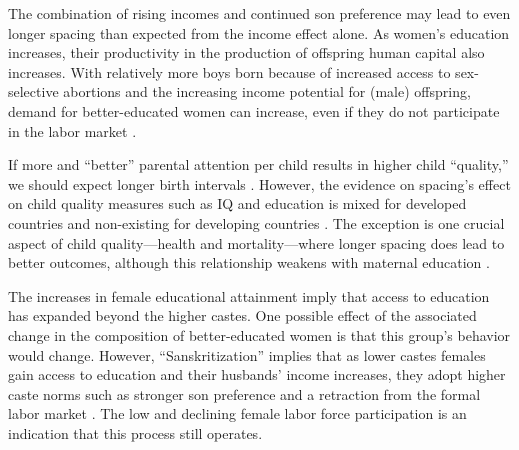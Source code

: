 \documentclass[12pt,letterpaper]{article}
\begin{document}
The combination of rising incomes and continued son preference may lead to even longer 
spacing than expected from the income effect alone.
As women's education increases, their productivity in the production of offspring human 
capital also increases.
With relatively more boys born because of increased access to sex-selective 
abortions and the increasing income potential for (male) offspring, demand for 
better-educated women can increase, even if they do not participate in the labor market 
\citep{Behrman1999}.

If more and ``better'' parental attention per child results in higher child ``quality,'' 
we should expect longer birth intervals \citep{Zajonc1975,Zajonc1976,Razin1980}.
However, the evidence on spacing's effect on child quality measures such as IQ 
and education is mixed for developed countries and non-existing for developing countries
\citep{Powell1993,Pettersson-Lidbom2009,Buckles2012,Barclay2017}.
The exception is one crucial aspect of child quality---health and mortality---where
longer spacing does lead to better outcomes, although this relationship weakens with 
maternal education \citep{Whitworth2002,Conde-Agudelo2012,Molitoris2019}.



The increases in female educational attainment imply that access to education has 
expanded beyond the higher castes. 
One possible effect of the associated change in the composition of better-educated women 
is that this group's behavior would change.
However, ``Sanskritization'' implies that as lower castes females gain access to 
education and their husbands' income increases, they adopt higher caste 
norms such as stronger son preference and a retraction from the formal labor 
market \citep{Srinivas1956,Chen1995,Abraham2013,Chatterjee2018}.
The low and declining female labor force participation is an indication that this
process still operates.

\end{document}
